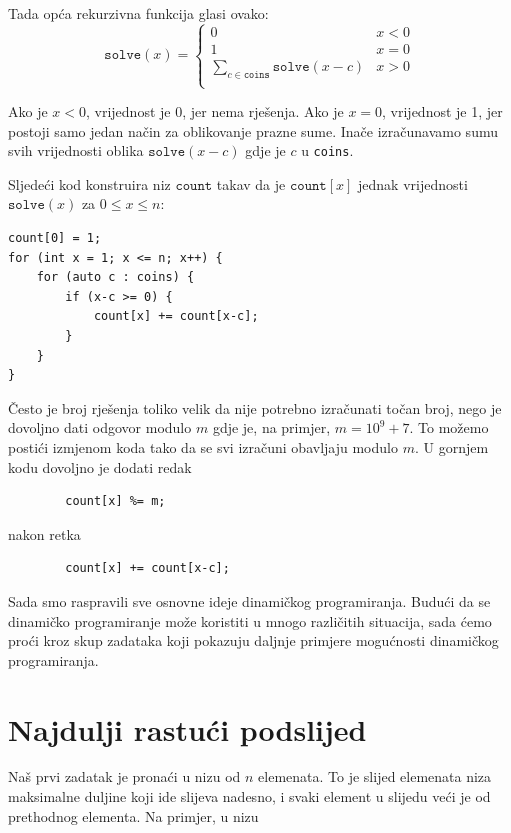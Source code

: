 Tada opća rekurzivna funkcija glasi ovako:
\begin{equation*}
    \texttt{solve}(x) = \begin{cases}
               0               & x < 0\\
               1               & x = 0\\
               \sum_{c \in \texttt{coins}} \texttt{solve}(x-c) & x > 0 \\
           \end{cases}
\end{equation*}

Ako je $x<0$, vrijednost je 0, jer nema rješenja.
Ako je $x=0$, vrijednost je 1, jer postoji samo jedan način
za oblikovanje prazne sume.
Inače izračunavamo sumu svih vrijednosti
oblika $\texttt{solve}(x-c)$ gdje je $c$ u \texttt{coins}.

Sljedeći kod konstruira niz
$\texttt{count}$ takav da je
$\texttt{count}[x]$ jednak
vrijednosti $\texttt{solve}(x)$
za $0 \le x \le n$:

\begin{lstlisting}
count[0] = 1;
for (int x = 1; x <= n; x++) {
    for (auto c : coins) {
        if (x-c >= 0) {
            count[x] += count[x-c];
        }
    }
}
\end{lstlisting}

Često je broj rješenja toliko velik
da nije potrebno izračunati točan broj,
nego je dovoljno dati odgovor modulo $m$
gdje je, na primjer, $m=10^9+7$.
To možemo postići izmjenom koda tako da se
svi izračuni obavljaju modulo $m$.
U gornjem kodu dovoljno je dodati redak
\begin{lstlisting}
        count[x] %= m;
\end{lstlisting}
nakon retka
\begin{lstlisting}
        count[x] += count[x-c];
\end{lstlisting}

Sada smo raspravili sve osnovne
ideje dinamičkog programiranja.
Budući da se dinamičko programiranje može koristiti
u mnogo različitih situacija,
sada ćemo proći kroz skup zadataka
koji pokazuju daljnje primjere
mogućnosti dinamičkog programiranja.

\section{Najdulji rastući podslijed}


Naš prvi zadatak je pronaći
u nizu od $n$ elemenata.
To je slijed elemenata niza
maksimalne duljine
koji ide slijeva nadesno,
i svaki element u slijedu veći je
od prethodnog elementa.
Na primjer, u nizu

